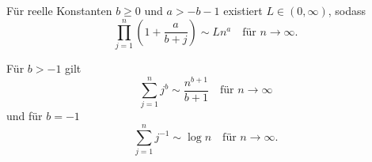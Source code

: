 \documentclass[ngerman,a4paper,11pt]{scrartcl}
\begin{document}
\begin{lem}\label{lem:sim}
  \begin{thmlist}
  \item Für reelle Konstanten $b\geq 0$ und $a>-b-1$ existiert $L\in(0,\infty)$,
    sodass\label{lem:sim:prod}
    \begin{equation*}
      \prod_{j=1}^n\left( 1+\frac{a}{b+j} \right) \sim Ln^a\quad\text{für $n\to\infty$.} 
    \end{equation*}
  \item Für $b>-1$ gilt
    \begin{equation*}
      \sum_{j=1}^nj^b \sim \frac{n^{b+1}}{b+1}\quad\text{für $n\to\infty$} 
    \end{equation*}
und für $b=-1$\label{lem:sim:sum}
    \begin{equation*}
      \sum_{j=1}^nj^{-1} \sim \log n\quad\text{für $n\to\infty$.} 
    \end{equation*}
  \end{thmlist}
\end{lem}
\end{document}
